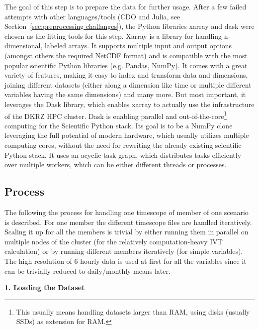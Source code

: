 The goal of this step is to prepare the data for further usage. 
After a few failed attempts with other languages/tools (CDO and Julia, see Section~\ref{sec:preprocessing challanges}), the Python libraries xarray \cite{hoyer_xarray_2017} and dask \cite{rocklin2015dask} were chosen as the fitting tools for this step.
Xarray is a library for handling n-dimensional, labeled arrays. It supports multiple input and output options (amongst others the required NetCDF format) and is compatible with the most popular scientific Python libraries (e.g. Pandas, NumPy). 
It comes with a great variety of features, making it easy to index and transform data and dimensions, joining different datasets (either along a dimension like time or multiple different variables having the same dimensions) and many more. 
But most important, it leverages the Dask library, which enables xarray to actually use the infrastructure of the DKRZ HPC cluster. 
Dask is enabling parallel and out-of-the-core\footnote{This usually means handling datasets larger than RAM, using disks (usually SSDs) as extension for RAM.} computing for the Scientific Python stack. 
Its goal is to be a NumPy clone leveraging the full potential of modern hardware, which usually utilizes multiple computing cores, without the need for rewriting the already existing scientific Python stack. 
It uses an acyclic task graph, which distributes tasks efficiently over multiple workers, which can be either different threads or processes. \cite{rocklin2015dask}


\subsection{Process}

The following the process for handling one timescope of member of one scenario is described. For one member the different timescope files are handled iteratively. 
Scaling it up for all the members is trivial by either running them in parallel on multiple nodes of the cluster (for the relatively computation-heavy IVT calculation) or by running different members iteratively (for simple variables). 
The high resolution of 6 hourly data is used at first for all the variables since it can be trivially reduced to daily/monthly means later. 

\textbf{1. Loading the Dataset}

